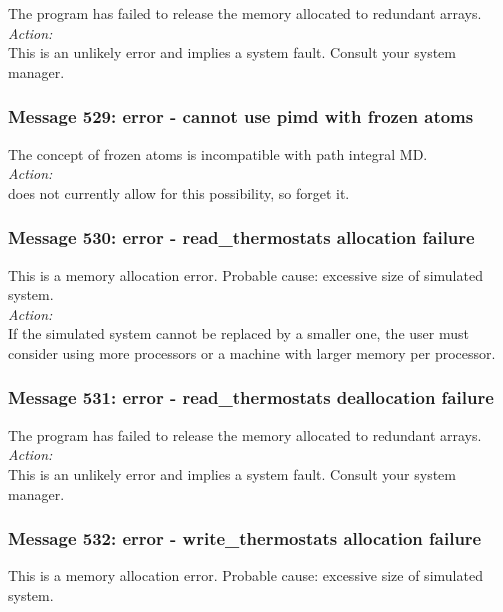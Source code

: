 The program has failed to release the memory allocated to redundant arrays.\\

\noindent
{\em Action:}\\
This is an unlikely error and implies a system fault. Consult your system manager.

\subsubsection*{Message 529: error - cannot use pimd with frozen atoms}

The concept of frozen atoms is incompatible with path integral MD. \\

\noindent
{\em Action:}\\
\DD{} does not currently allow for this possibility, so forget it.

\subsubsection*{Message 530: error - read\_thermostats allocation failure}

This is a memory allocation error. Probable cause: excessive size of
simulated system. \\

\noindent
{\em Action:}\\
If the simulated system cannot be replaced by a smaller one, the user
must consider using more processors or a machine with larger memory
per processor.

\subsubsection*{Message 531: error - read\_thermostats deallocation failure}

The program has failed to release the memory allocated to redundant arrays.\\

\noindent
{\em Action:}\\
This is an unlikely error and implies a system fault. Consult your system manager.

\subsubsection*{Message 532: error - write\_thermostats allocation failure}

This is a memory allocation error. Probable cause: excessive size of
simulated system. \\

